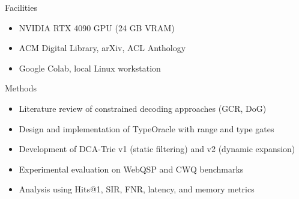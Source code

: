\documentclass{beamer}
\begin{document}
\begin{frame}{Facilities}
    \begin{itemize}
        \item NVIDIA RTX 4090 GPU (24 GB VRAM)
        \vspace{0.3cm}
        \item ACM Digital Library, arXiv, ACL Anthology
        \vspace{0.3cm}
        \item Google Colab, local Linux workstation
    \end{itemize}
\end{frame}

\begin{frame}{Methods}
    \begin{itemize}
        \item Literature review of constrained decoding approaches (GCR, DoG)
        \item Design and implementation of TypeOracle with range and type gates
        \item Development of DCA-Trie v1 (static filtering) and v2 (dynamic expansion)
        \item Experimental evaluation on WebQSP and CWQ benchmarks
        \item Analysis using Hits@1, SIR, FNR, latency, and memory metrics
    \end{itemize}
\end{frame}
\end{document}
